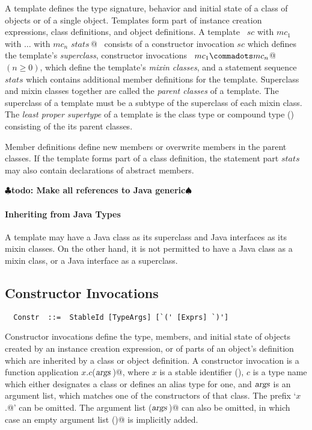 \documentclass[a4paper,12pt,twoside,titlepage]{book}
\newcommand{\args}{\mbox{\sl args}}
\renewcommand{\todo}[1]{{$\clubsuit$\bf todo: #1$\spadesuit$}}
\begin{document}
A template defines the type signature, behavior and initial state of a
class of objects or of a single object. Templates form part of
instance creation expressions, class definitions, and object
definitions.  A template
~\lstinline@$sc$ with $mc_1$ with $\ldots$ with $mc_n$ {$stats\,$}@~ consists of a
constructor invocation $sc$ which defines the template's {\em
superclass}, constructor invocations ~\lstinline@$mc_1 \commadots mc_n$@~ 
$(n \geq 0)$, which define the template's {\em mixin classes}, and a
statement sequence $stats$ which contains additional member
definitions for the template.  Superclass and mixin classes together
are called the {\em parent classes} of a template.  The superclass of
a template must be a subtype of the superclass of each mixin class.
The {\em least proper supertype} of a template is the class type or
compound type () consisting of the its parent classes.

Member definitions define new members or overwrite members in the
parent classes.  If the template forms part of a class definition,
the statement part $stats$ may also contain declarations of abstract members.

\todo{Make all references to Java generic}

\paragraph{Inheriting from Java Types} A template may have a Java class as
its superclass and Java interfaces as its mixin classes. On the other
hand, it is not permitted to have a Java class as a mixin class, or a
Java interface as a superclass.

\subsection{Constructor Invocations}
\label{sec:constr-invoke}
\syntax\begin{lstlisting}
  Constr  ::=  StableId [TypeArgs] [`(' [Exprs] `)']  
\end{lstlisting}

Constructor invocations define the type, members, and initial state of
objects created by an instance creation expression, or of parts of an
object's definition which are inherited by a class or object
definition. A constructor invocation is a function application
\lstinline@$x$.$c$($\args\,$)@, where $x$ is a stable identifier
(), $c$ is a type name which either
designates a class or defines an alias type for one, and $\args$
is an argument list, which matches one of the constructors of that
class. The prefix `\lstinline@$x$.@' can be omitted. 
The argument list \lstinline@($\args\,$)@ can also be omitted, in which case an
empty argument list \lstinline@()@ is implicitly added.
\end{document}
